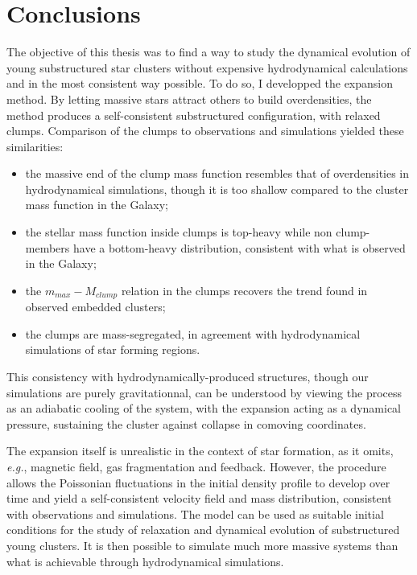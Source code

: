 \chapter{Conclusions}

The objective of this thesis was to find a way to study the dynamical evolution of young substructured star clusters without expensive hydrodynamical calculations and in the most consistent way possible. To do so, I developped the \HubLem expansion method. By letting massive stars attract others to build overdensities, the method produces a self-consistent substructured configuration, with relaxed clumps. Comparison of the clumps to observations and simulations yielded these similarities:

\begin{itemize}
\item the massive end of the clump mass function resembles that of overdensities in hydrodynamical simulations, though it is too shallow compared to the cluster mass function in the Galaxy;
\item the stellar mass function inside clumps is top-heavy while non clump-members have a bottom-heavy distribution, consistent with what is observed in the Galaxy;
\item the $m_{max} - M_{clump}$ relation in the clumps recovers the trend found in observed embedded clusters;
\item the clumps are mass-segregated, in agreement with hydrodynamical simulations of star forming regions.
\end{itemize}

This consistency with hydrodynamically-produced structures, though our simulations are purely gravitationnal, can be understood by viewing the \HubLem process as an adiabatic cooling of the system, with the expansion acting as a dynamical pressure, sustaining the cluster against collapse in comoving coordinates.

The expansion itself is unrealistic in the context of star formation, as it omits, \textit{e.g.}, magnetic field, gas fragmentation and feedback. However, the procedure allows the Poissonian fluctuations in the initial density profile to develop over time and yield a self-consistent velocity field and mass distribution, consistent with observations and simulations. The model can be used as suitable initial conditions for the study of relaxation and dynamical evolution of substructured young clusters. It is then possible to simulate much more massive systems than what is achievable through hydrodynamical simulations.

